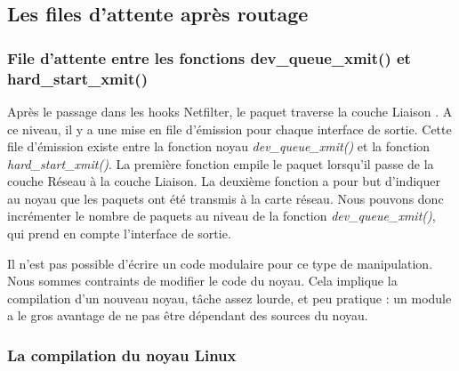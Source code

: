 \documentclass[a4paper]{article}
\begin{document}
\subsection{Les files d'attente après routage}

\subsubsection{File d'attente entre les fonctions dev\_queue\_xmit() et hard\_start\_xmit()}

Après le passage dans les hooks Netfilter, le paquet traverse la couche Liaison \cite{intel} \cite{stack}. A ce niveau, il y a une mise en file d’émission pour chaque interface de sortie. Cette file d’émission existe entre la fonction noyau \textit{dev\_queue\_xmit()} et la fonction \textit{hard\_start\_xmit()}. La première fonction empile le paquet lorsqu’il passe de la couche Réseau à la couche Liaison. La deuxième fonction a pour but d’indiquer au noyau que les paquets ont été transmis à la carte réseau. Nous pouvons donc incrémenter le nombre de paquets au niveau de la fonction \textit{dev\_queue\_xmit()}, qui prend en compte l’interface de sortie.

Il n’est pas possible d’écrire un code modulaire pour ce type de manipulation.
Nous sommes contraints de modifier le code du noyau. Cela implique la compilation
d'un nouveau noyau, tâche assez lourde, et peu pratique : un module a le gros
avantage de ne pas être dépendant des sources du noyau.

\subsubsection{La compilation du noyau Linux}
\end{document}
